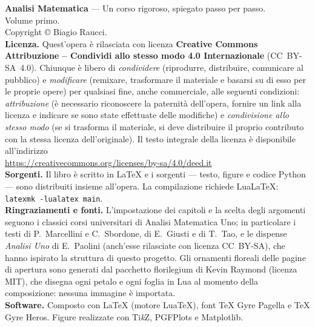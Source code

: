 \clearpage
\thispagestyle{empty}
\null\vfill
\begin{flushleft}
\small
{\sffamily\bfseries\color{blu}Analisi Matematica} --- Un corso rigoroso, spiegato passo per passo.\\
Volume primo.\\[2mm]
Copyright \copyright{} \the\year{} Biagio Raucci.\\[4mm]

{\sffamily\bfseries\color{blu}Licenza.}
Quest'opera è rilasciata con licenza
\textbf{Creative Commons Attribuzione -- Condividi allo stesso modo 4.0 Internazionale}
(CC~BY-SA~4.0). Chiunque è libero di \emph{condividere} (riprodurre, distribuire,
comunicare al pubblico) e \emph{modificare} (remixare, trasformare il materiale e
basarsi su di esso per le proprie opere) per qualsiasi fine, anche commerciale, alle
seguenti condizioni: \emph{attribuzione} (è necessario riconoscere la paternità
dell'opera, fornire un link alla licenza e indicare se sono state effettuate delle
modifiche) e \emph{condivisione allo stesso modo} (se si trasforma il materiale, si deve
distribuire il proprio contributo con la stessa licenza dell'originale).
Il testo integrale della licenza è disponibile all'indirizzo\\
\url{https://creativecommons.org/licenses/by-sa/4.0/deed.it}\\[4mm]

{\sffamily\bfseries\color{blu}Sorgenti.}
Il libro è scritto in \LaTeX{} e i sorgenti --- testo, figure e codice Python ---
sono distribuiti insieme all'opera. La compilazione richiede \textsf{LuaLaTeX}:
\texttt{latexmk -lualatex main}.\\[4mm]

{\sffamily\bfseries\color{blu}Ringraziamenti e fonti.}
L'impostazione dei capitoli e la scelta degli argomenti seguono i classici corsi
universitari di Analisi Matematica Uno; in particolare i testi di P.~Marcellini e
C.~Sbordone, di E.~Giusti e di T.~Tao, e le dispense \emph{Analisi Uno} di E.~Paolini
(anch'esse rilasciate con licenza CC~BY-SA), che hanno ispirato la struttura di questo
progetto. Gli ornamenti floreali delle pagine di apertura sono generati dal pacchetto
\textsf{florilegium} di Kevin Raymond (licenza MIT), che disegna ogni petalo e ogni
foglia in Lua al momento della composizione: nessuna immagine è importata.\\[4mm]

{\sffamily\bfseries\color{blu}Software.}
Composto con \LaTeX{} (motore LuaTeX), font TeX Gyre Pagella e TeX Gyre Heros.
Figure realizzate con Ti\emph{k}Z, PGFPlots e Matplotlib.
\end{flushleft}
\vspace{10mm}
